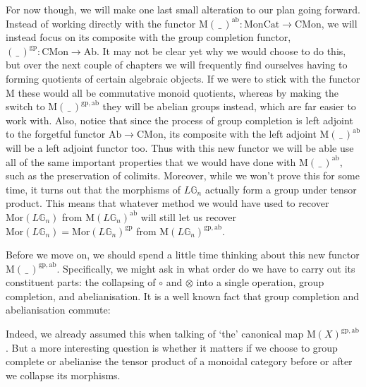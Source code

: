 For now though, we will make one last small alteration to our plan going forward. Instead of working directly with the functor $\mathrm{M}(\, \_ \,)^{\mathrm{ab}}: \mathrm{MonCat} \to \mathrm{CMon}$, we will instead focus on its composite with the group completion functor, $( \, \_ \, )^{\mathrm{gp}} : \mathrm{CMon} \to \mathrm{Ab}$. It may not be clear yet why we would choose to do this, but over the next couple of chapters we will frequently find ourselves having to forming quotients of certain algebraic objects. If we were to stick with the functor $\mathrm{M}$ these would all be commutative monoid quotients, whereas by making the switch to $\mathrm{M}(\, \_ \,)^{\mathrm{gp},\mathrm{ab}}$ they will be abelian groups instead, which are far easier to work with. Also, notice that since the process of group completion is left adjoint to the forgetful functor $\mathrm{Ab} \to \mathrm{CMon}$, its composite with the left adjoint $\mathrm{M}(\, \_ \,)^{\mathrm{ab}}$ will be a left adjoint functor too. Thus with this new functor we will be able use all of the same important properties that we would have done with $\mathrm{M}(\, \_ \,)^{\mathrm{ab}}$, such as the preservation of colimits. Moreover, while we won't prove this for some time, it turns out that the morphisms of $L\mathbb{G}_n$ actually form a group under tensor product. This means that whatever method we would have used to recover $\mathrm{Mor}(L\mathbb{G}_n)$ from $\mathrm{M}(L\mathbb{G}_n)^{\mathrm{ab}}$ will still let us recover $\mathrm{Mor}(L\mathbb{G}_n) = \mathrm{Mor}(L\mathbb{G}_n)^{\mathrm{gp}}$ from $\mathrm{M}(L\mathbb{G}_n)^{\mathrm{gp},\mathrm{ab}}$.

Before we move on, we should spend a little time thinking about this new functor $\mathrm{M}(\, \_ \,)^{\mathrm{gp},\mathrm{ab}}$. Specifically, we might ask in what order do we have to carry out its constituent parts: the collapsing of $\circ$ and $\otimes$ into a single operation, group completion, and abelianisation. It is a well known fact that group completion and abelianisation commute:
\begin{eq*}  \end{eq*}
Indeed, we already assumed this when talking of `the' canonical map $\mathrm{M}(X)^{\mathrm{gp},\mathrm{ab}}$. But a more interesting question is whether it matters if we choose to group complete or abelianise the tensor product of a monoidal category before or after we collapse its morphisms.

